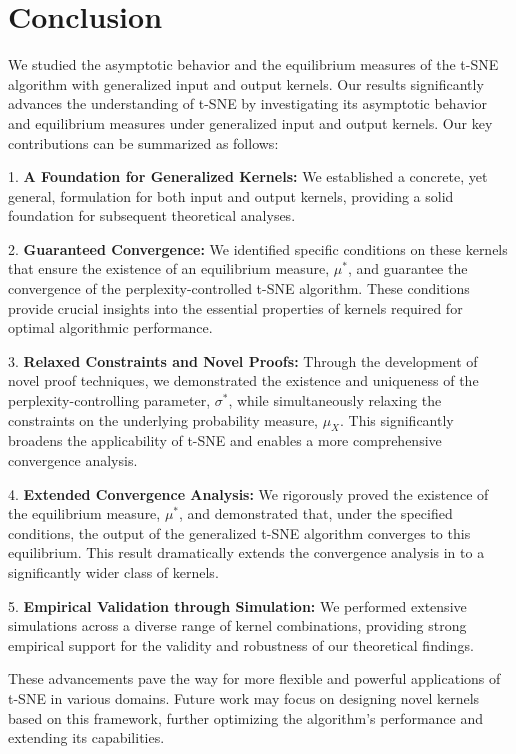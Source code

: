 \section{Conclusion}
We studied the asymptotic behavior and the equilibrium measures of the t-SNE algorithm with generalized input and output kernels. Our results significantly advances the understanding of t-SNE by investigating its asymptotic behavior and equilibrium measures under generalized input and output kernels. Our key contributions can be summarized as follows:

1. \textbf{A Foundation for Generalized Kernels:} We established a concrete, yet general, formulation for both input and output kernels, providing a solid foundation for subsequent theoretical analyses.

2. \textbf{Guaranteed Convergence:} We identified specific conditions on these kernels that ensure the existence of an equilibrium measure, $\mu^*$, and guarantee the convergence of the perplexity-controlled t-SNE algorithm. These conditions provide crucial insights into the essential properties of kernels required for optimal algorithmic performance.

3. \textbf{Relaxed Constraints and Novel Proofs:} Through the development of novel proof techniques, we demonstrated the existence and uniqueness of the perplexity-controlling parameter, $\sigma^*$, while simultaneously relaxing the constraints on the underlying probability measure, $\mu_X$. This significantly broadens the applicability of t-SNE and enables a more comprehensive convergence analysis.

4. \textbf{Extended Convergence Analysis:} We rigorously proved the existence of the equilibrium measure, $\mu^*$, and demonstrated that, under the specified conditions, the output of the generalized t-SNE algorithm converges to this equilibrium. This result dramatically extends the convergence analysis in \cite{auffinger-tsne} to a significantly wider class of kernels.

5. \textbf{Empirical Validation through Simulation:} We performed extensive simulations across a diverse range of kernel combinations, providing strong empirical support for the validity and robustness of our theoretical findings.

These advancements pave the way for more flexible and powerful applications of t-SNE in various domains. Future work may focus on designing novel kernels based on this framework, further optimizing the algorithm's performance and extending its capabilities.
